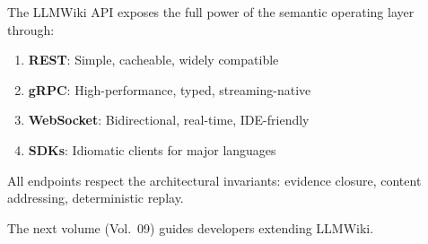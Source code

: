 The LLMWiki API exposes the full power of the semantic operating layer through:
\begin{enumerate}
  \item \textbf{REST}: Simple, cacheable, widely compatible
  \item \textbf{gRPC}: High-performance, typed, streaming-native
  \item \textbf{WebSocket}: Bidirectional, real-time, IDE-friendly
  \item \textbf{SDKs}: Idiomatic clients for major languages
\end{enumerate}
All endpoints respect the architectural invariants: evidence closure, content addressing, deterministic replay.

The next volume (Vol.~09) guides developers extending LLMWiki.

